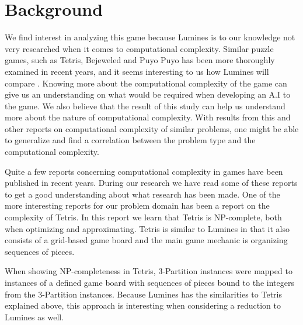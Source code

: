 \section{Background}

We find interest in analyzing this game because Lumines is to our knowledge not very researched when it comes to computational complexity. Similar puzzle games, such as Tetris, Bejeweled and Puyo Puyo has been more thoroughly examined in recent years, and it seems interesting to us how 
Lumines will compare . Knowing more about the computational complexity of the game can give us an understanding on what would be required when developing an A.I to the game.  We also believe that the result of this study can help us understand more about the nature of computational complexity. With results from this and other reports on computational complexity of similar problems, one might be able to generalize and find a correlation between the problem type and the computational complexity. 

Quite a few reports concerning computational complexity in games have been published in recent years. During our research we have read some of these reports to get a good understanding about what research has been made. One of the more interesting reports for our problem domain has been a report on the complexity of Tetris. In this report we learn that Tetris is NP-complete, both when optimizing and approximating. Tetris is similar to Lumines in that it also consists of a grid-based game board and the main game mechanic is organizing sequences of pieces.

When showing NP-completeness in Tetris, 3-Partition instances were mapped to instances of a defined game board with sequences of pieces bound to the integers from the 3-Partition instances. Because Lumines has the similarities to Tetris explained above, this approach is interesting when considering a reduction to Lumines as well.
